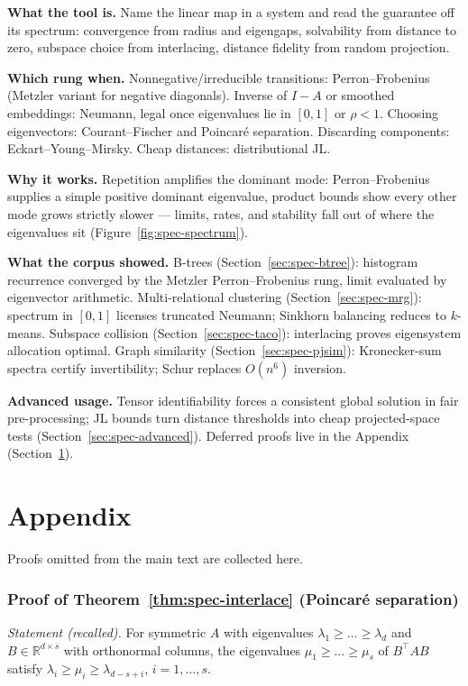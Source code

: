 \begin{recap}
\item \textbf{What the tool is.} Name the linear map in a system and read the guarantee off its spectrum: convergence from radius and eigengaps,
  solvability from distance to zero, subspace choice from interlacing,
  distance fidelity from random projection.
\item \textbf{Which rung when.} Nonnegative/irreducible transitions:
  Perron--Frobenius (Metzler variant for negative diagonals). Inverse of
  $I - A$ or smoothed embeddings: Neumann, legal once eigenvalues lie in
  $[0,1]$ or $\rho < 1$. Choosing eigenvectors: Courant--Fischer and
  Poincar\'e separation. Discarding components: Eckart--Young--Mirsky.
  Cheap distances: distributional JL.
\item \textbf{Why it works.} Repetition amplifies the dominant mode:
  Perron--Frobenius supplies a simple positive dominant eigenvalue, product
  bounds show every other mode grows strictly slower --- limits, rates, and
  stability fall out of where the eigenvalues sit
  (Figure~\ref{fig:spec-spectrum}).
\item \textbf{What the corpus showed.} B-trees
  (Section~\ref{sec:spec-btree}): histogram recurrence converged by the
  Metzler Perron--Frobenius rung, limit evaluated by eigenvector
  arithmetic. Multi-relational clustering (Section~\ref{sec:spec-mrg}):
  spectrum in $[0,1]$ licenses truncated Neumann; Sinkhorn balancing
  reduces to $k$-means. Subspace collision (Section~\ref{sec:spec-taco}):
  interlacing proves eigensystem allocation optimal. Graph similarity
  (Section~\ref{sec:spec-pjsim}): Kronecker-sum spectra certify
  invertibility; Schur replaces $O(n^6)$ inversion.
\item \textbf{Advanced usage.} Tensor identifiability forces a consistent
  global solution in fair pre-processing; JL bounds turn distance
  thresholds into cheap projected-space tests
  (Section~\ref{sec:spec-advanced}). Deferred proofs live in the Appendix
  (Section~\ref{sec:spec-appendix}).
\end{recap}

\section{Appendix}
\label{sec:spec-appendix}

Proofs omitted from the main text are collected here.

\subsubsection*{Proof of Theorem~\ref{thm:spec-interlace} (Poincar\'e separation)}
{\itshape Statement (recalled).} For symmetric $A$ with eigenvalues
$\lambda_1 \ge \dots \ge \lambda_d$ and $B \in \mathbb{R}^{d \times s}$ with
orthonormal columns, the eigenvalues $\mu_1 \ge \dots \ge \mu_s$ of
$B^{\top}\!AB$ satisfy $\lambda_i \ge \mu_i \ge \lambda_{d-s+i}$,
$i = 1,\dots,s$.\eop

